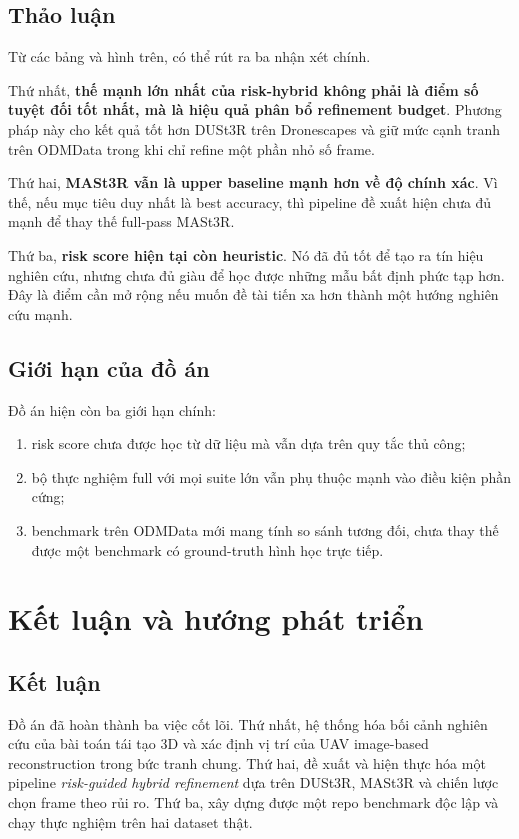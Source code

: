 \documentclass[12pt,a4paper,oneside]{report}
\begin{document}
\section{Thảo luận}

Từ các bảng và hình trên, có thể rút ra ba nhận xét chính.

Thứ nhất, \textbf{thế mạnh lớn nhất của risk-hybrid không phải là điểm số tuyệt đối tốt nhất, mà là hiệu quả phân bổ refinement budget}. Phương pháp này cho kết quả tốt hơn DUSt3R trên Dronescapes và giữ mức cạnh tranh trên ODMData trong khi chỉ refine một phần nhỏ số frame.

Thứ hai, \textbf{MASt3R vẫn là upper baseline mạnh hơn về độ chính xác}. Vì thế, nếu mục tiêu duy nhất là best accuracy, thì pipeline đề xuất hiện chưa đủ mạnh để thay thế full-pass MASt3R.

Thứ ba, \textbf{risk score hiện tại còn heuristic}. Nó đã đủ tốt để tạo ra tín hiệu nghiên cứu, nhưng chưa đủ giàu để học được những mẫu bất định phức tạp hơn. Đây là điểm cần mở rộng nếu muốn đề tài tiến xa hơn thành một hướng nghiên cứu mạnh.

\section{Giới hạn của đồ án}

Đồ án hiện còn ba giới hạn chính:
\begin{enumerate}[leftmargin=1.5em]
  \item risk score chưa được học từ dữ liệu mà vẫn dựa trên quy tắc thủ công;
  \item bộ thực nghiệm full với mọi suite lớn vẫn phụ thuộc mạnh vào điều kiện phần cứng;
  \item benchmark trên ODMData mới mang tính so sánh tương đối, chưa thay thế được một benchmark có ground-truth hình học trực tiếp.
\end{enumerate}

\chapter{Kết luận và hướng phát triển}

\section{Kết luận}

Đồ án đã hoàn thành ba việc cốt lõi. Thứ nhất, hệ thống hóa bối cảnh nghiên cứu của bài toán tái tạo 3D và xác định vị trí của UAV image-based reconstruction trong bức tranh chung. Thứ hai, đề xuất và hiện thực hóa một pipeline \textit{risk-guided hybrid refinement} dựa trên DUSt3R, MASt3R và chiến lược chọn frame theo rủi ro. Thứ ba, xây dựng được một repo benchmark độc lập và chạy thực nghiệm trên hai dataset thật.
\end{document}
